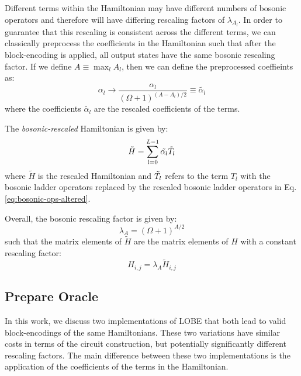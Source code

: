 Different terms within the Hamiltonian may have different numbers of bosonic operators and therefore will have differing rescaling factors of $\lambda_{A_l}$.
In order to guarantee that this rescaling is consistent across the different terms, we can classically preprocess the coefficients in the Hamiltonian such that after the block-encoding is applied, all output states have the same bosonic rescaling factor.
If we define $A \equiv \max_l{A_l}$, then we can define the preprocessed coeffieints as:
\begin{equation}
    \label{eq:bosonic-coeff-rescaling}
    \alpha_l \rightarrow \frac{\alpha_l}{(\Omega + 1)^{(A - A_l)/2}} \equiv \tilde{\alpha_l}
\end{equation}
where the coefficients $\tilde{\alpha_l}$ are the rescaled coefficients of the terms.

The \textit{bosonic-rescaled} Hamiltonian is given by:
\begin{equation}
    \label{eq:bosonically-rescaled-hamiltonian}
    \tilde{H} = \sum_{l=0}^{L-1} \tilde{\alpha_l} \Tilde{T}_l
\end{equation}
where $\tilde{H}$ is the rescaled Hamiltonian and $\Tilde{T}_l$ refers to the term $T_l$ with the bosonic ladder operators replaced by the rescaled bosonic ladder operators in Eq. \ref{eq:bosonic-ops-altered}.

Overall, the bosonic rescaling factor is given by:
\begin{equation}
    \label{eq:bosonic-rescaling-factor}
    \lambda_A = (\Omega + 1)^{A/2}
\end{equation}
such that the matrix elements of $\tilde{H}$ are the matrix elements of $H$ with a constant rescaling factor:
\begin{equation}
    H_{i,j} = \lambda_A \tilde{H}_{i,j}
\end{equation}

\subsection{Prepare Oracle}
\label{subsec:prepare}

In this work, we discuss two implementations of LOBE that both lead to valid block-encodings of the same Hamiltonians.
These two variations have similar costs in terms of the circuit construction, but potentially significantly different rescaling factors.
The main difference between these two implementations is the application of the coefficients of the terms in the Hamiltonian.

